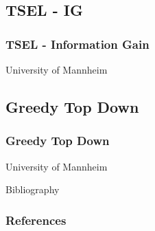 \documentclass{beamer}
\begin{document}
\subsection{TSEL - IG}
\begin{frame}
	\frametitle{TSEL - Information Gain}
	University of Mannheim
\end{frame}
\subsection{Greedy Top Down}
\begin{frame}
	\frametitle{Greedy Top Down}
	University of Mannheim
\end{frame}
\begin{frame}[allowframebreaks]{Bibliography}
	\frametitle{References}
	
	
\end{frame}
\end{document}
